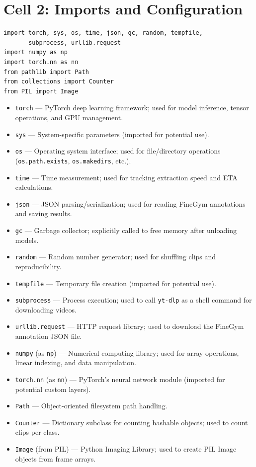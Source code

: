 \section{Cell 2: Imports and Configuration}

\begin{lstlisting}
import torch, sys, os, time, json, gc, random, tempfile,
       subprocess, urllib.request
import numpy as np
import torch.nn as nn
from pathlib import Path
from collections import Counter
from PIL import Image
\end{lstlisting}

\begin{explanation}
\begin{itemize}[nosep]
  \item \texttt{torch} --- PyTorch deep learning framework; used for model inference, tensor operations, and GPU management.
  \item \texttt{sys} --- System-specific parameters (imported for potential use).
  \item \texttt{os} --- Operating system interface; used for file/directory operations (\texttt{os.path.exists}, \texttt{os.makedirs}, etc.).
  \item \texttt{time} --- Time measurement; used for tracking extraction speed and ETA calculations.
  \item \texttt{json} --- JSON parsing/serialization; used for reading FineGym annotations and saving results.
  \item \texttt{gc} --- Garbage collector; explicitly called to free memory after unloading models.
  \item \texttt{random} --- Random number generator; used for shuffling clips and reproducibility.
  \item \texttt{tempfile} --- Temporary file creation (imported for potential use).
  \item \texttt{subprocess} --- Process execution; used to call \texttt{yt-dlp} as a shell command for downloading videos.
  \item \texttt{urllib.request} --- HTTP request library; used to download the FineGym annotation JSON file.
  \item \texttt{numpy} (as \texttt{np}) --- Numerical computing library; used for array operations, linear indexing, and data manipulation.
  \item \texttt{torch.nn} (as \texttt{nn}) --- PyTorch's neural network module (imported for potential custom layers).
  \item \texttt{Path} --- Object-oriented filesystem path handling.
  \item \texttt{Counter} --- Dictionary subclass for counting hashable objects; used to count clips per class.
  \item \texttt{Image} (from PIL) --- Python Imaging Library; used to create PIL Image objects from frame arrays.
\end{itemize}
\end{explanation}

